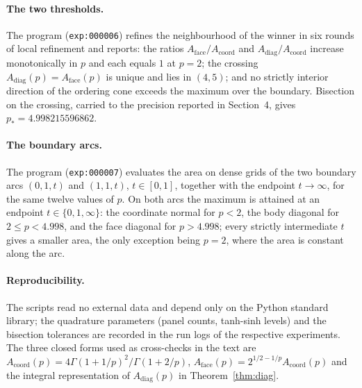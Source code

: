 \documentclass[11pt]{article}
\theoremstyle{plain}
\numberwithin{theorem}{section}
\begin{document}
\paragraph{The two thresholds.} The program  (\texttt{exp:000006}) refines the neighbourhood of the winner in six rounds of local refinement and reports: the ratios $A_{\mathrm{face}}/A_{\mathrm{coord}}$ and $A_{\mathrm{diag}}/A_{\mathrm{coord}}$ increase monotonically in $p$ and each equals $1$ at $p=2$; the crossing $A_{\mathrm{diag}}(p)=A_{\mathrm{face}}(p)$ is unique and lies in $(4,5)$; and no strictly interior direction of the ordering cone exceeds the maximum over the boundary. Bisection on the crossing, carried to the precision reported in Section~4, gives $p_*=4.998215596862$.

\paragraph{The boundary arcs.} The program  (\texttt{exp:000007}) evaluates the area on dense grids of the two boundary arcs $(0,1,t)$ and $(1,1,t)$, $t\in[0,1]$, together with the endpoint $t\to\infty$, for the same twelve values of $p$. On both arcs the maximum is attained at an endpoint $t\in\{0,1,\infty\}$: the coordinate normal for $p<2$, the body diagonal for $2\le p<4.998$, and the face diagonal for $p>4.998$; every strictly intermediate $t$ gives a smaller area, the only exception being $p=2$, where the area is constant along the arc.

\paragraph{Reproducibility.} The scripts read no external data and depend only on the Python standard library; the quadrature parameters (panel counts, tanh-sinh levels) and the bisection tolerances are recorded in the run logs of the respective experiments. The three closed forms used as cross-checks in the text are $A_{\mathrm{coord}}(p)=4\Gamma(1+1/p)^2/\Gamma(1+2/p)$, $A_{\mathrm{face}}(p)=2^{1/2-1/p}A_{\mathrm{coord}}(p)$ and the integral representation of $A_{\mathrm{diag}}(p)$ in Theorem~\ref{thm:diag}.


\end{document}
